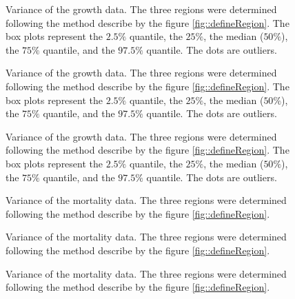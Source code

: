 \begin{refsection}
\begin{figure}
	\centering
	
	\caption{Variance of the growth data. The three regions were determined following the method describe by the figure \ref{fig::defineRegion}. The box plots represent the $ 2.5 \%$ quantile, the $ 25 \% $, the median ($ 50 \% $), the $ 75 \% $ quantile, and the $ 97.5 \% $ quantile. The dots are outliers. \label{fig::growthVar7-9}}
\end{figure}

\begin{figure}
	\centering
	
	\caption{Variance of the growth data. The three regions were determined following the method describe by the figure \ref{fig::defineRegion}. The box plots represent the $ 2.5 \%$ quantile, the $ 25 \% $, the median ($ 50 \% $), the $ 75 \% $ quantile, and the $ 97.5 \% $ quantile. The dots are outliers. \label{fig::growthVar10-12}}
\end{figure}

\begin{figure}
	\centering
	
	\caption{Variance of the growth data. The three regions were determined following the method describe by the figure \ref{fig::defineRegion}. The box plots represent the $ 2.5 \%$ quantile, the $ 25 \% $, the median ($ 50 \% $), the $ 75 \% $ quantile, and the $ 97.5 \% $ quantile. The dots are outliers. \label{fig::growthVar13-14}}
\end{figure}

\begin{figure}
	\centering
	
	\caption{Variance of the mortality data. The three regions were determined following the method describe by the figure \ref{fig::defineRegion}. \label{fig::mortalityVar1-3}}
\end{figure}

\begin{figure}
	\centering
	
	\caption{Variance of the mortality data. The three regions were determined following the method describe by the figure \ref{fig::defineRegion}. \label{fig::mortalityVa4-6}}
\end{figure}

\begin{figure}
	\centering
	
	\caption{Variance of the mortality data. The three regions were determined following the method describe by the figure \ref{fig::defineRegion}. \label{fig::mortalityVa7-9}}
\end{figure}


\end{refsection}
